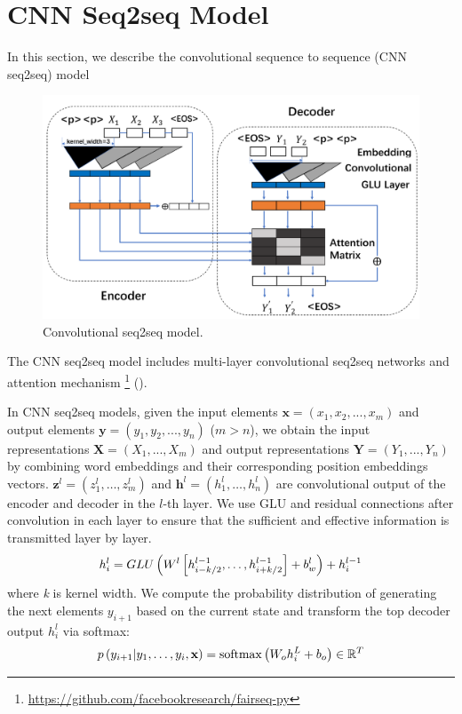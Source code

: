 \section{CNN Seq2seq Model}
\label{sec:cnn}

In this section, we describe the convolutional sequence to sequence (CNN seq2seq) model

\begin{figure}[th]
    \centering
    \includegraphics[width=1.0\columnwidth]{cnn}
    \caption{Convolutional seq2seq model. }
    \label{fig:basicModel}
\end{figure}

The CNN seq2seq model includes multi-layer convolutional seq2seq networks \cite{gehring2017convs2s} and attention mechanism \footnote{\url{https://github.com/facebookresearch/fairseq-py}}
().

In CNN seq2seq models, given the input elements $\textbf{x} = (x_{1},x_{2},...,x_{m})$ and 
output elements $\textbf{y} = (y_{1}, y_{2},..., y_{n})$ ($m>n$),
we obtain the input representations  $\mathbf{X} = (X_1,...,X_m)$ 
and output representations $\mathbf{Y}=(Y_1,...,Y_n)$ by combining
word embeddings and their corresponding position embeddings vectors. 
$\mathbf { z } ^ { l } = \left( z _ { 1 } ^ { l } , \ldots , z _ { m } ^ { l } \right)$ and $\mathbf { h } ^ { l } = \left( h _ { 1 } ^ { l } , \ldots , h _ { n } ^ { l } \right)$ 
are convolutional output of the encoder and decoder in the $l$-th layer.
We use GLU \cite{DauphinFAG17} and residual connections \cite{HeZRS16} after convolution 
in each layer to ensure that the sufficient and effective information is transmitted layer by layer.  
\begin{equation}
\small
    h _ { i } ^ { l } = GLU \left( W ^ { l } \left[ h _ {i-k/2 } ^ { l - 1 } , \ldots , h _ { i+k/2 } ^ { l - 1 } \right] + b _ { w } ^ { l } \right) + h _ { i } ^ { l - 1 }
\end{equation} 
where \textit{k} is kernel width.
We compute the probability
distribution of generating the next elements $y_{i+1}$
based on the current state and transform the top
decoder output $h_{i}^{l}$ via softmax:
\begin{equation}
\small
    p \left( y _ { i + 1 } | y _ { 1 } , \ldots , y _ { i } , \mathbf { x } \right) = \operatorname { softmax } \left( W _ { o } h _ { i } ^ { L } + b _ { o } \right) \in \mathbb { R } ^ { T }
\end{equation}

